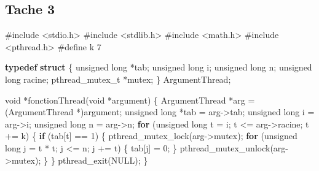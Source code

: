 \documentclass[
    ]{article}
\newenvironment{Shaded}{}{}
\newcommand{\ControlFlowTok}[1]{\textcolor[rgb]{0.00,0.44,0.13}{\textbf{#1}}}
\newcommand{\DataTypeTok}[1]{\textcolor[rgb]{0.56,0.13,0.00}{#1}}
\newcommand{\DecValTok}[1]{\textcolor[rgb]{0.25,0.63,0.44}{#1}}
\newcommand{\ImportTok}[1]{#1}
\newcommand{\KeywordTok}[1]{\textcolor[rgb]{0.00,0.44,0.13}{\textbf{#1}}}
\newcommand{\NormalTok}[1]{#1}
\newcommand{\PreprocessorTok}[1]{\textcolor[rgb]{0.74,0.48,0.00}{#1}}
\begin{document}
\hypertarget{tache-3}{%
\subsection{Tache 3}\label{tache-3}}
\begin{Shaded}
\begin{Highlighting}[]
\PreprocessorTok{\#include }\ImportTok{\textless{}stdio.h\textgreater{}}
\PreprocessorTok{\#include }\ImportTok{\textless{}stdlib.h\textgreater{}}
\PreprocessorTok{\#include }\ImportTok{\textless{}math.h\textgreater{}}
\PreprocessorTok{\#include }\ImportTok{\textless{}pthread.h\textgreater{}}
\PreprocessorTok{\#define k 7}

\KeywordTok{typedef} \KeywordTok{struct}
\NormalTok{\{}
    \DataTypeTok{unsigned} \DataTypeTok{long}\NormalTok{ *tab;}
    \DataTypeTok{unsigned} \DataTypeTok{long}\NormalTok{ i;}
    \DataTypeTok{unsigned} \DataTypeTok{long}\NormalTok{ n;}
    \DataTypeTok{unsigned} \DataTypeTok{long}\NormalTok{ racine;}
\NormalTok{    pthread\_mutex\_t *mutex;}
\NormalTok{\} ArgumentThread;}

\DataTypeTok{void}\NormalTok{ *fonctionThread(}\DataTypeTok{void}\NormalTok{ *argument)}
\NormalTok{\{}
\NormalTok{    ArgumentThread *arg = (ArgumentThread *)argument;}
    \DataTypeTok{unsigned} \DataTypeTok{long}\NormalTok{ *tab = arg{-}\textgreater{}tab;}
    \DataTypeTok{unsigned} \DataTypeTok{long}\NormalTok{ i = arg{-}\textgreater{}i;}
    \DataTypeTok{unsigned} \DataTypeTok{long}\NormalTok{ n = arg{-}\textgreater{}n;}
    \ControlFlowTok{for}\NormalTok{ (}\DataTypeTok{unsigned} \DataTypeTok{long}\NormalTok{ t = i; t \textless{}= arg{-}\textgreater{}racine; t += k)}
\NormalTok{    \{}
        \ControlFlowTok{if}\NormalTok{ (tab[t] == }\DecValTok{1}\NormalTok{)}
\NormalTok{        \{}
\NormalTok{            pthread\_mutex\_lock(arg{-}\textgreater{}mutex);}
            \ControlFlowTok{for}\NormalTok{ (}\DataTypeTok{unsigned} \DataTypeTok{long}\NormalTok{ j = t * t; j \textless{}= n; j += t)}
\NormalTok{            \{}
\NormalTok{                tab[j] = }\DecValTok{0}\NormalTok{;}
\NormalTok{            \}}
\NormalTok{            pthread\_mutex\_unlock(arg{-}\textgreater{}mutex);}
\NormalTok{        \}}
\NormalTok{    \}}
\NormalTok{    pthread\_exit(NULL);}
\NormalTok{\}}
\end{Highlighting}
\end{Shaded}
\end{document}
